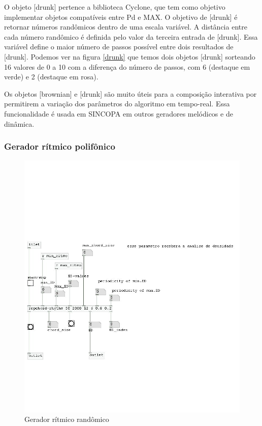 \documentclass[draft]{ppgmus}
\begin{document}
O objeto [drunk] pertence a biblioteca Cyclone, que tem como objetivo
implementar objetos compatíveis entre Pd e MAX. O objetivo de [drunk] é
retornar números randômicos dentro de uma escala variável. A distância
entre cada número randômico é definida pelo valor da terceira entrada
de [drunk]. Essa variável define o maior número de passos possível entre 
dois resultados de [drunk]. Podemos ver na figura \ref{drunk} que temos
dois objetos [drunk] sorteando 16 valores de 0 a 10 com a diferença do
número de passos, com 6 (destaque em verde) e 2 (destaque em rosa).

Os objetos [brownian] e [drunk] são muito úteis para a composição 
interativa por permitirem a variação dos parâmetros do algoritmo
em tempo-real. Essa funcionalidade é usada em SINCOPA em outros geradores
melódicos e de dinâmica.


\subsubsection{Gerador rítmico polifônico}


\begin{figure}
\includegraphics[scale=.6]{gerador-ritmico3}
\caption{Gerador rítmico randômico}
\label{gera-ritmico3}
\end{figure}  
\end{document}
